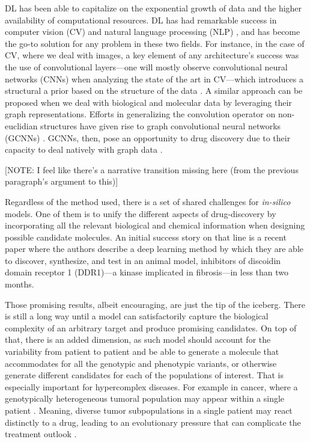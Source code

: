 \documentclass{article}
\begin{document}
DL has been able to capitalize on the exponential growth of data and the higher
 availability of computational resources. DL has had remarkable success in computer
 vision (CV) \cite{Guo2016} and natural language processing (NLP) \cite{Young2018}, and
 has become the go-to solution for any problem in these two fields. For instance, in the
 case of CV, where we deal with images, a key element of any architecture's success was
 the use of convolutional layers---one will mostly observe convolutional neural networks
 (CNNs) when analyzing the state of the art in CV---which introduces a structural a
 prior based on the structure of the data \cite{Fukushima1980, LeCun1989, Ulyanov}. A
 similar approach can be proposed when we deal with biological and molecular data by
 leveraging their graph representations. Efforts in generalizing the convolution
 operator on non-euclidian structures have given rise to graph convolutional neural
 networks (GCNNs) \cite{Wu2019}. GCNNs, then, {\color{red} pose an opportunity to drug
 discovery due} to their capacity to deal natively with graph data \cite{Sun2019}.

{\color{red} [NOTE: I feel like there's a narrative transition missing here (from the
previous paragraph's argument to this)]}

{\color{red}Regardless of the method used, there is a set of shared challenges for
 \emph{in-silico} models. One of them is to unify the different aspects of
 drug-discovery by incorporating all the relevant biological and chemical
 information when designing possible candidate molecules.} An initial success story on
 that line is a recent paper \cite{Zhavoronkov2019} where the authors describe a deep
 learning method by which they are able to discover, synthesize, and test in an animal
 model, inhibitors of discoidin domain receptor 1 (DDR1)—a kinase implicated in
 fibrosis—in less than two months.

Those promising results, albeit encouraging, are just the tip of the iceberg. There is
 still a long way until a model can satisfactorily capture the biological complexity of
 an arbitrary target and produce promising candidates. On top of that, there is an added
 dimension, as such model should account for the variability from patient to patient and
 be able to generate a molecule that accommodates for all the genotypic and phenotypic
 variants, or otherwise generate different candidates for each of the populations of
 interest. That is especially important for hypercomplex diseases. For example in
 cancer, where a genotypically heterogeneous tumoral population may appear within a
 single patient \cite{Boland2017}. Meaning, diverse tumor subpopulations in a single
 patient may react distinctly to a drug, leading to an evolutionary pressure that can
 complicate the treatment outlook \cite{Enriquez-Navas2015}.
\end{document}
